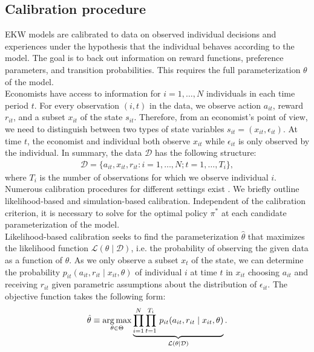 \subsection{Calibration procedure}
EKW models are calibrated to data on observed individual decisions and experiences under the hypothesis that the individual behaves according to the model. The goal is to back out information on reward functions, preference parameters, and transition probabilities. This requires the full parameterization $\theta$ of the model.\\

\noindent Economists have access to information for $i = 1, \hdots, N$ individuals in each time period $t$. For every observation $(i, t)$ in the data, we observe action $a_{it}$, reward $r_{it}$, and a subset $x_{it}$ of the state $s_{it}$. Therefore, from an economist's point of view, we need to distinguish between two types of state variables $s_{it} = (x_{it}, \epsilon_{it})$. At time $t$, the economist and individual both observe $x_{it}$ while $\epsilon_{it}$ is only observed by the individual. In summary, the data $\mathcal{D}$ has the following structure:
%
\begin{align*}
  \mathcal{D} = \{a_{it}, x_{it}, r_{it}: i = 1, \hdots, N; t = 1, \hdots, T_i\},
\end{align*}
where $T_i$ is the number of observations for which we observe individual $i$.\\

\noindent Numerous calibration procedures for different settings exist \citep{Davidson.2003, Gourieroux.1996}. We briefly outline likelihood-based and simulation-based calibration. Independent of the calibration criterion, it is necessary to solve for the optimal policy $\pi^*$ at each candidate parameterization of the model.\\

\noindent Likelihood-based calibration seeks to find the parameterization $\hat{\theta}$ that maximizes the likelihood function $\mathcal{L}(\theta\mid\mathcal{D})$, i.e. the probability of observing the given data as a function of $\theta$. As we only observe a subset $x_t$ of the state, we can determine the probability $p_{it}(a_{it}, r_{it} \mid x_{it}, \theta)$ of individual $i$ at time $t$ in $x_{it}$ choosing $a_{it}$ and receiving $r_{it}$ given parametric assumptions about the distribution of $\epsilon_{it}$. The objective function takes the following form:
%
\begin{align*}
  \hat{\theta} \equiv \operatorname*{arg\,max}_{\theta \in \Theta}  \underbrace{\prod^N_{i= 1} \prod^{T_i}_{t= 1}\, p_{it}(a_{it}, r_{it} \mid x_{it}, \theta)}_{\mathcal{L}(\theta\mid\mathcal{D})}.
\end{align*}

